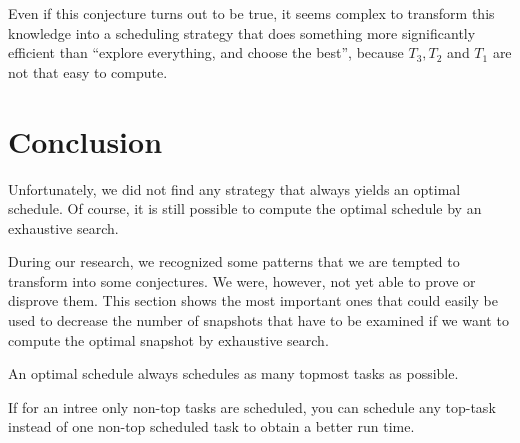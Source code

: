 Even if this conjecture turns out to be true, it seems complex to transform this knowledge into a scheduling strategy that does something more significantly efficient than ``explore everything, and choose the best'', because $T_3, T_2$ and $T_1$ are not that easy to compute.

\clearpage{}

\section{Conclusion}
\label{sec:p3-conclusion}

Unfortunately, we did not find any strategy that always yields an optimal schedule. Of course, it is still possible to compute the optimal schedule by an exhaustive search.

During our research, we recognized some patterns that we are tempted to transform into some conjectures. We were, however, not yet able to prove or disprove them. This section shows the most important ones that could easily be used to decrease the number of snapshots that have to be examined if we want to compute the optimal snapshot by exhaustive search.




\begin{conjecture}
  An optimal schedule always schedules as many topmost tasks as possible.
\end{conjecture}

\begin{conjecture}
  If for an intree only non-top tasks are scheduled, you can schedule any top-task instead of one non-top scheduled task to obtain a better run time.
\end{conjecture}


